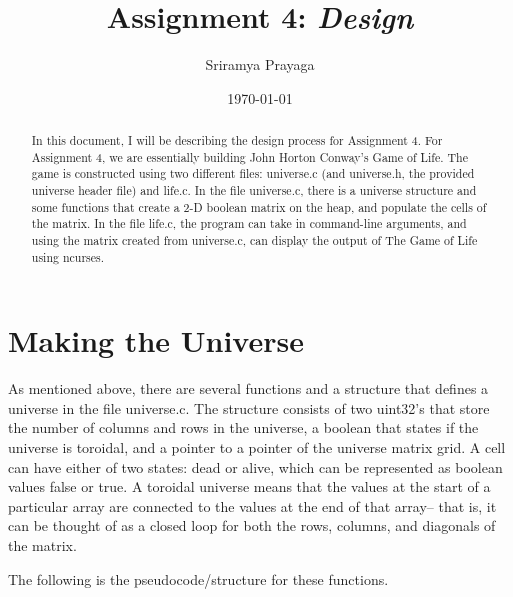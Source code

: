 \documentclass[11pt]{article}
\title{Assignment 4: \emph{Design}}
\author{Sriramya Prayaga}
\date{\today}
\begin{document}
 \maketitle

\begin{abstract}
\begin{center}
In this document, I will be describing the design process for Assignment 4. For Assignment 4, we are essentially building John Horton Conway's Game of Life. The game is constructed using two different files: universe.c (and universe.h, the provided universe header file) and life.c. In the file universe.c, there is a universe structure and some functions that create a 2-D boolean matrix on the heap, and populate the cells of the matrix. In the file life.c, the program can take in command-line arguments, and using the matrix created from universe.c, can display the output of The Game of Life using ncurses. 
\end{center}
\end{abstract}
\section{Making the Universe}
As mentioned above, there are several functions and a structure that defines a universe in the file universe.c. The structure consists of two uint32's that store the number of columns and rows in the universe, a boolean that states if the universe is toroidal, and a pointer to a pointer of the universe matrix grid. A cell can have either of two states: dead or alive, which can be represented as boolean values false or true. A toroidal universe means that the values at the start of a particular array are connected to the values at the end of that array-- that is, it can be thought of as a closed loop for both the rows, columns, and diagonals of the matrix.

The following is the pseudocode/structure for these functions.
\end{document}
